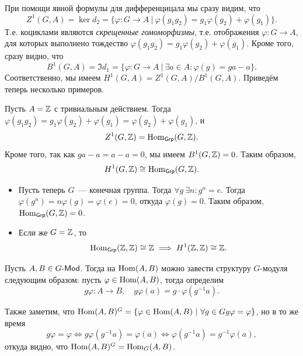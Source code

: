  	\begin{example}
 		При помощи явной формулы для дифференцицала мы сразу видим, что 
 		\[
 			Z^{1}(G, A) = \ker{d_2} = \{ \varphi\colon G \to A \ \vert \ \varphi(g_1 g_2) = g_1 \varphi(g_2) + \varphi(g_1)\}.
 		\]
 		Т.е. коциклами являются \emph{скрещенные гомоморфизмы}, т.е. отображения $\varphi\colon G \to A$, для которых выполнено тождество $\varphi(g_1 g_2) = g_1 \varphi(g_2) + \varphi(g_1)$. Кроме того, сразу видно, что 
 		\[
 			B^{1}(G, A) = \Im{d_1} =  \{ \varphi \colon G \to A \ \vert \ \exists a \in A \colon \varphi(g) = ga - a \}. 
 		\]
 		Соответственно, мы имеем $H^{1}(G, A) = Z^{1}(G, A) / B^{1}(G, A)$. Приведём теперь несколько примеров.

 		Пусть $A = \mathbb{Z}$ с тривиальным действием. Тогда $\varphi(g_1 g_2) = g_1 \varphi(g_2) + \varphi(g_1) = \varphi(g_2) + \varphi(g_1)$, и 
 			\[
 				Z^{1}(G, \mathbb{Z}) = \operatorname{Hom}_{\mathsf{Grp}}(G, \mathbb{Z}). 
 			\]
		 Кроме того, так как $ga - a = a - a = 0$, мы имеем $B^{1}(G, \mathbb{Z}) = 0$. Таким образом,
		 \[
		 	H^{1}(G, \mathbb{Z}) \cong \operatorname{Hom}_{\mathsf{Grp}}(G, \mathbb{Z}).
		 \]

		 \begin{itemize}
		 	\item Пусть теперь $G$~--- конечная группа. Тогда $\forall g \ \exists n \colon g^n = e$. Тогда $\varphi(g^n) = n \varphi(g) = \varphi(e) = 0$, откуда $\varphi(g) = 0$. Таким образом, $\operatorname{Hom}_{\mathsf{Grp}}(G, \mathbb{Z}) = 0$. 

		 	\item Если же $G = \mathbb{Z}$, то 
		 	\[
		 		\operatorname{Hom}_{\mathsf{Grp}}(\mathbb{Z}, \mathbb{Z}) \cong \mathbb{Z} \implies H^1(\mathbb{Z}, \mathbb{Z}) \cong \mathbb{Z}.
		 	\]
		 \end{itemize}

 	\end{example}
	
	\begin{definition} 
		Пусть $A, B \in G\text{-}\mathsf{Mod}$. Тогда на $\operatorname{Hom}(A, B)$ можно завести структуру $G$-модуля следующим образом: пусть $\varphi \in \operatorname{Hom}(A, B)$, тогда определим 
		\[
			g\varphi\colon A \to B, \quad g\varphi(a) = g \cdot \varphi(g^{-1}a). 
		\]
	\end{definition}

	\begin{remark}
		Также заметим, что $\operatorname{Hom}(A, B)^{G} = \{ \varphi \in \operatorname{Hom}(A, B) \ \vert \ \forall g \in G g \varphi = \varphi \} $, но в то же время 
		\[
			g\varphi = \varphi \Leftrightarrow g \varphi(g^{-1}a) = \varphi(a) \Leftrightarrow \varphi(g^{-1} a) = g^{-1}\varphi(a),
		\]
		откуда видно, что $\operatorname{Hom}(A, B)^{G} = \operatorname{Hom}_{G}(A, B)$. 
		
	\end{remark}

